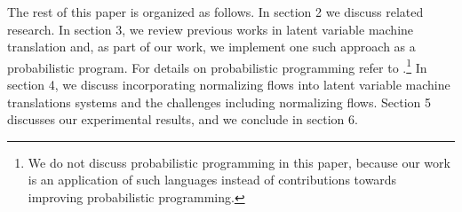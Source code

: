 The rest of this paper is organized as follows.
In section 2 we discuss related research. In section 3, we review previous works in latent variable machine translation and, as part of our work, we implement one such approach as a probabilistic program. For details on probabilistic programming refer to \citet{janwillem2018IntrotoProbProg}.\footnote{We do not discuss probabilistic programming in this paper, because our work is an application of such languages instead of contributions towards improving probabilistic programming.} In section 4, we discuss incorporating normalizing flows into latent variable machine translations systems and the challenges including normalizing flows. Section 5 discusses our experimental results, and we conclude in section 6. 



